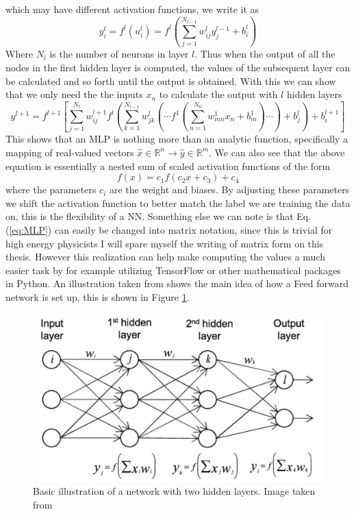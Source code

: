\documentclass[14pt, a4paper]{book}
\begin{document}
which may have different activation functions, we write it as
$$
    y^l_i=f^l(u_i^l)=f^l\left(\sum_{j=1}^{N_{l-1}}w_{ij}^ly^{l-1}_j + b^l_i\right)
$$
Where $N_l$ is the number of neurons in layer $l$. Thus when the output of all the nodes in the first hidden layer is computed, the values of the subsequent layer can be calculated and so forth until the output is obtained. 
With this we can show that we only need the the inputs $x_n$ to calculate the output with $l$ hidden layers
\begin{equation}\label{eq:MLP}
    y^{l+1}=f^{l+1}\left[\sum_{j=1}^{N_l}w^{l+1}_{ij}f^l\left(\sum_{k=1}^{N_{l-1}}w^{l}_{jk}\left(\cdots f^{1}\left(\sum_{n=1}^{N_0}w^1_{mn}x_n+b_m^1\right)\cdots\right)+b_j^{l}\right)+b^{l+1}_i   \right]
\end{equation}
This shows that an MLP is nothing more than an analytic function, specifically a mapping of real-valued vectors $\hat{x}\in\mathbb{R}^n\rightarrow\hat{y}\in\mathbb{R}^m$. We can also see that the above equation is essentially 
a nested sum of scaled activation functions of the form
$$
  f(x)=c_1f(c_2x+c_3)+c_4  
$$
where the parameters $c_i$ are the weight and biases. By adjusting these parameters we shift the activation function to better match the label we are training the data on, this is the flexibility of a NN. 
Something else we can note is that Eq. (\ref{eq:MLP}) can easily be changed into matrix notation, since this is trivial for high energy physicists I will spare myself the writing of matrix form on this thesis. 
However this realization can help make computing the values a much easier task by for example utilizing TensorFlow or other mathematical packages in Python. An illustration taken from \cite{MORTYY1} shows the main idea of how a 
Feed forward network is set up, this is shown in Figure \ref{fig:NN}.
\begin{figure}[!ht]
    \centering
    \includegraphics[width=0.5\linewidth]{NN.png}
    \caption[Basic Neural Network Illustration]{Basic illustration of a network with two hidden layers. Image taken from \cite{MORTYY1}}
    \label{fig:NN}
\end{figure}
\end{document}
